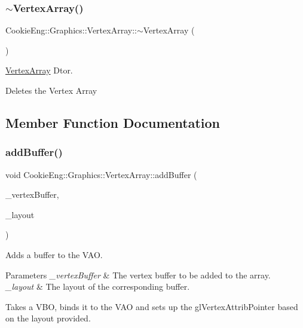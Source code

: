 \subsubsection{\texorpdfstring{$\sim$\+Vertex\+Array()}{~VertexArray()}}
{\footnotesize\ttfamily Cookie\+Eng\+::\+Graphics\+::\+Vertex\+Array\+::$\sim$\+Vertex\+Array (\begin{DoxyParamCaption}{ }\end{DoxyParamCaption})}



\hyperlink{class_cookie_eng_1_1_graphics_1_1_vertex_array}{Vertex\+Array} Dtor. 

Deletes the Vertex Array 

\subsection{Member Function Documentation}
\mbox{\label{class_cookie_eng_1_1_graphics_1_1_vertex_array_aacb98fcc69be4c0ca1a4d8deb38b053e}} 
\subsubsection{\texorpdfstring{add\+Buffer()}{addBuffer()}}
{\footnotesize\ttfamily void Cookie\+Eng\+::\+Graphics\+::\+Vertex\+Array\+::add\+Buffer (\begin{DoxyParamCaption}\item[{const \hyperlink{class_cookie_eng_1_1_graphics_1_1_vertex_buffer}{Vertex\+Buffer} \&}]{\+\_\+vertex\+Buffer,  }\item[{const \hyperlink{class_cookie_eng_1_1_graphics_1_1_vertex_buffer_layout}{Vertex\+Buffer\+Layout} \&}]{\+\_\+layout }\end{DoxyParamCaption})}



Adds a buffer to the V\+AO. 


\begin{DoxyParams}{Parameters}
{\em \+\_\+vertex\+Buffer} & The vertex buffer to be added to the array. \\
\hline
{\em \+\_\+layout} & The layout of the corresponding buffer.\\
\hline
\end{DoxyParams}
Takes a V\+BO, binds it to the V\+AO and sets up the gl\+Vertex\+Attrib\+Pointer based on the layout provided. \mbox{\label{class_cookie_eng_1_1_graphics_1_1_vertex_array_afaa952a05a501cb487831cb6e9e052bf}} 
